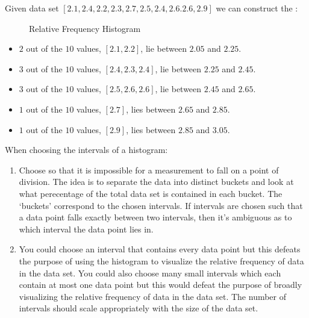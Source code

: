 \begin{note}
    Given data set $[2.1,2.4,2.2,2.3,2.7,2.5,2.4,2.6.2.6,2.9]$ we can construct the :

    \begin{figure}[h]
        \centering
        
        \caption{Relative Frequency Histogram}
        \label{fig:rfh}
    \end{figure}
    
    \begin{itemize}
        \item $2$ out of the $10$ values, $[2.1, 2.2]$, lie between $2.05$ and $2.25$.
        \item $3$ out of the $10$ values, $[2.4, 2.3, 2.4]$, lie between $2.25$ and $2.45$.
        \item $3$ out of the $10$ values, $[2.5, 2.6, 2.6]$, lie between $2.45$ and $2.65$.
        \item $1$ out of the $10$ values, $[2.7]$, lies between $2.65$ and $2.85$.
        \item $1$ out of the $10$ values, $[2.9]$, lies between $2.85$ and $3.05$.
    \end{itemize}
\end{note}

\begin{rmrk}
    When choosing the intervals of a histogram:
    \begin{enumerate}
        \item Choose so that it is impossible for a measurement to fall on a point of division. The idea is to separate the data into distinct buckets and look at what perecentage of the total data set is contained in each bucket. The `buckets' correspond to the chosen intervals. If intervals are chosen such that a data point falls exactly between two intervals, then it's ambiguous as to which interval the data point lies in.
        \item You could choose an interval that contains every data point but this defeats the purpose of using the histogram to visualize the relative frequency of data in the data set. You could also choose many small intervals which each contain at most one data point but this would defeat the purpose of broadly visualizing the relative frequency of data in the data set. The number of intervals should scale appropriately with the size of the data set.
    \end{enumerate}
\end{rmrk}

